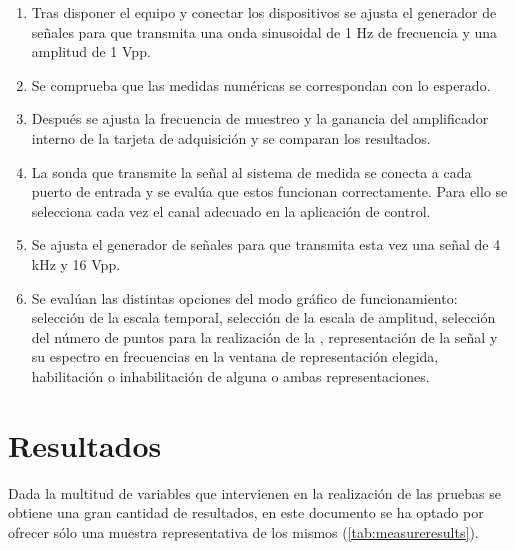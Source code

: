 \begin{enumerate}
    \item Tras disponer el equipo y conectar los dispositivos se ajusta el
	generador de señales para que transmita una onda sinusoidal de 1 Hz
	de frecuencia y una amplitud de 1 Vpp.
    \item Se comprueba que las medidas numéricas se correspondan con lo
	esperado.
    \item Después se ajusta la frecuencia de muestreo y la ganancia del
	amplificador interno de la tarjeta de adquisición y se comparan los
	resultados.
    \item La sonda que transmite la señal al sistema de medida se conecta a
	cada puerto de entrada y se evalúa que estos funcionan
	correctamente. Para ello se selecciona cada vez el canal adecuado
	en la aplicación de control.
    \item Se ajusta el generador de señales para que transmita esta vez una
	señal de 4 kHz y 16 Vpp.
    \item Se evalúan las distintas opciones del modo gráfico de
	funcionamiento: selección de la escala temporal, selección de la
	escala de amplitud, selección del número de puntos para la
	realización de la , representación de la señal y su
	espectro en frecuencias en la ventana de representación elegida,
	habilitación o inhabilitación de alguna o ambas representaciones.
\end{enumerate}


\section{Resultados}

Dada la multitud de variables que intervienen en la realización de las
pruebas se obtiene una gran cantidad de resultados, en este documento se ha
optado por ofrecer sólo una muestra representativa de los mismos
(\cref{tab:measureresults}).

